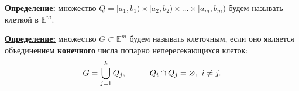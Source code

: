\documentclass[a4paper,12pt]{article} %
\begin{document}
\underline{\textbf{Определение:}} множество $Q = [a_1, b_1) \times [a_2, b_2) \times \dots \times [a_m, b_m)$ будем называть клеткой в $\mathbb{E}^m$.

\vspace{3mm}

\underline{\textbf{Определение:}} множество $G \subset \mathbb{E}^m$ будем называть клеточным, если оно является объединением \textbf{конечного} числа попарно непересекающихся клеток:
\begin{equation*}
	G = \bigcup_{j = 1}^k Q_j, \hspace{10mm} Q_i \cap Q_j = \varnothing, \text{ }i \neq j.
\end{equation*}


\begin{figure}[h!]
	\begin{minipage}[h]{0.5\linewidth}
	\end{minipage}
	\hfill
	\begin{minipage}[h]{0.5\linewidth}

\end{minipage}
\end{figure}
\end{document}
